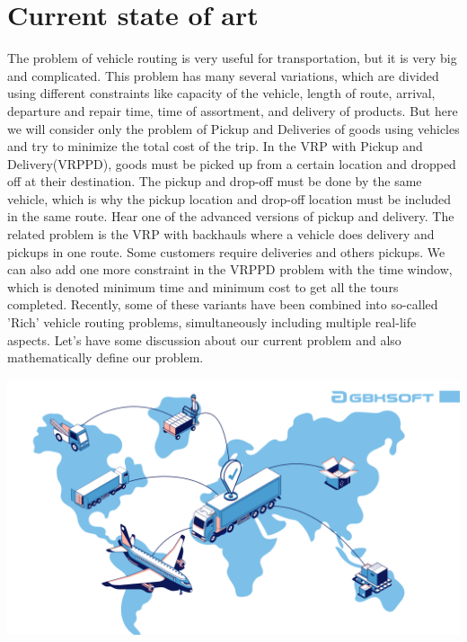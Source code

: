 \documentclass[conference]{IEEEtran}
\begin{document}
\section{{\textbf{Current state of art}}}
The problem of vehicle routing is very useful for transportation, but it is very big and complicated. This problem has many several variations, which are divided using different constraints like capacity of the vehicle, length of route, arrival, departure and repair time, time of assortment, and delivery of products. But here we will consider only the problem of Pickup and Deliveries of goods using vehicles and try to minimize the total cost of the trip. In the VRP with Pickup and Delivery(VRPPD), goods must be picked up from a certain location and dropped off at their destination. The pickup and drop-off must be done by the same vehicle, which is why the pickup location and drop-off location must be included in the same route. Hear one of the advanced versions of pickup and delivery. The related problem is the VRP with backhauls where a vehicle does delivery and pickups in one route. Some customers require deliveries and others pickups. We can also add one more constraint in the VRPPD problem with the time window, which is denoted minimum time and minimum cost to get all the tours completed. Recently, some of these variants have been combined into so-called 'Rich' vehicle routing problems, simultaneously including multiple real-life aspects. Let's have some discussion about our current problem and also mathematically define our problem. \\

\begin{center}
\includegraphics[width=1\linewidth]{
Cover-1.png}\par  
\end{center}
\end{document}
